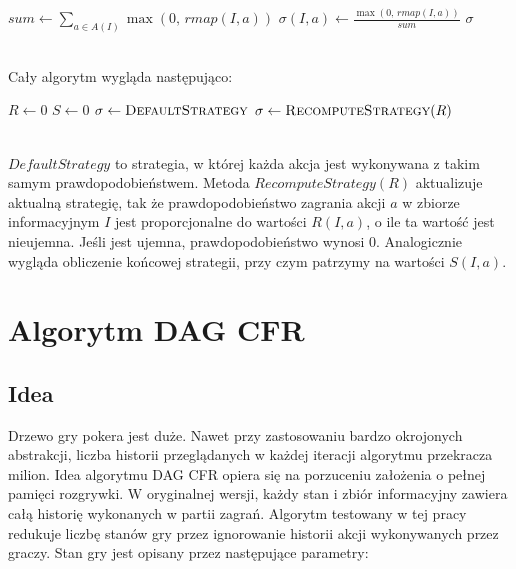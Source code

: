 \documentclass[licencjacka]{pracamgr}
\begin{document}
\begin{algorithmic}
            \State $sum \gets \sum\limits_{a \in A(I)} \max(0, \, rmap(I, a))$
                \State $\sigma(I, a) \gets \frac{\max(0, \, rmap(I, a))}{sum}$
            \EndFor
        \EndFor
        \State \Return $\sigma$
    \EndFunction
\end{algorithmic}

$\,$ \\
\noindent
Cały algorytm wygląda następująco: \\

\begin{algorithmic}
        \State $R \gets 0$
        \State $S \gets 0$
        \State $\sigma \gets \Call{DefaultStrategy}{}$
            \State {}
            \State $\sigma \gets \Call{RecomputeStrategy}{R}$
        \EndFor
        \State \Return {}
    \EndFunction
\end{algorithmic}

$\,$ \\
\noindent
$DefaultStrategy$ to strategia, w której każda akcja jest wykonywana z takim samym prawdopodobieństwem. Metoda
$RecomputeStrategy(R)$ aktualizuje aktualną strategię, tak że prawdopodobieństwo zagrania akcji $a$ w zbiorze informacyjnym
$I$ jest proporcjonalne do wartości $R(I, a)$, o ile ta wartość jest nieujemna. Jeśli jest ujemna, prawdopodobieństwo
wynosi $0$. Analogicznie wygląda obliczenie końcowej strategii, przy czym patrzymy na wartości $S(I, a)$.

\chapter{Algorytm DAG CFR}

\section{Idea}

Drzewo gry pokera jest duże. Nawet przy zastosowaniu bardzo okrojonych abstrakcji, liczba historii przeglądanych w każdej
iteracji algorytmu przekracza milion. Idea algorytmu DAG CFR opiera się na porzuceniu założenia o pełnej pamięci rozgrywki.
W oryginalnej wersji, każdy stan i zbiór informacyjny zawiera całą historię wykonanych w partii zagrań. Algorytm testowany
w tej pracy redukuje liczbę stanów gry przez ignorowanie historii akcji wykonywanych
przez graczy. Stan gry jest opisany przez następujące parametry: \\
\end{document}
